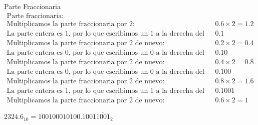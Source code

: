 \begin{frame}{Parte Fraccionaria}
                    \begin{align*}
                        \text{Parte fraccionaria: } & \\
                        \text{Multiplicamos la parte fraccionaria por 2: } & 0.6 \times 2 = 1.2 \\
                        \text{La parte entera es 1, por lo que escribimos un 1 a la derecha del punto: } & 0.1 \\
                        \text{Multiplicamos la parte fraccionaria por 2 de nuevo: } & 0.2 \times 2 = 0.4 \\
                        \text{La parte entera es 0, por lo que escribimos un 0 a la derecha del punto: } & 0.10 \\
                        \text{Multiplicamos la parte fraccionaria por 2 de nuevo: } & 0.4 \times 2 = 0.8 \\
                        \text{La parte entera es 0, por lo que escribimos un 0 a la derecha del punto: } & 0.100 \\
                        \text{Multiplicamos la parte fraccionaria por 2 de nuevo: } & 0.8 \times 2 = 1.6 \\
                        \text{La parte entera es 1, por lo que escribimos un 1 a la derecha del punto: } & 0.1001 \\
                        \text{Multiplicamos la parte fraccionaria por 2 de nuevo: } & 0.6 \times 2 = 1
                    \end{align*}

\begin{solution}
	$2324.6_{10} = 100100010100.1001\overline{1001}_2$
\end{solution}
\end{frame}


